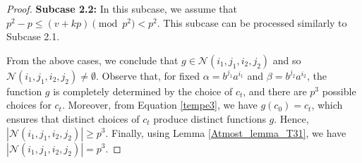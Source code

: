 \documentclass[10pt,a4paper]{amsart}
\begin{document}
\begin{proof}
\textbf{Subcase 2.2:} In this subcase, we assume that $p^2-p \leq (v+kp)\pmod {p^2} <p^2$. This subcase can be processed similarly to Subcase 2.1. 

From the above cases, we conclude that $g \in \mathcal{N}(i_1,j_1,i_2,j_2)$ and so $\mathcal{N}(i_1,j_1,i_2,j_2) \neq \emptyset$. Observe that, for fixed $\alpha = b^{j_1}a^{i_1}$ and $\beta = b^{j_2}a^{i_2}$, the function $g$ is completely determined by the choice of $c_t$, and there are $p^{3}$ possible choices for $c_t$. Moreover, from Equation \eqref{tempe3}, we have $g(c_0)=c_t$, which ensures that distinct choices of $c_t$ produce distinct functions $g$. Hence,
$|\mathcal{N}(i_1,j_1,i_2,j_2)| \ge p^{3}.$
Finally, using Lemma \ref{Atmost_lemma_T31}, we have $|\mathcal{N}(i_1,j_1,i_2,j_2)|=p^3$.
\end{proof}
\end{document}
